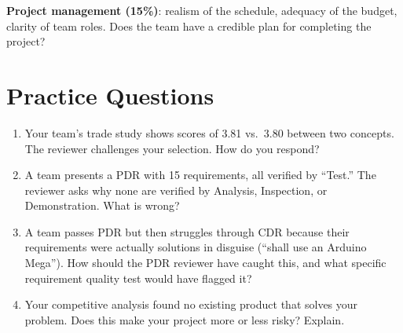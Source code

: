 \textbf{Project management (15\%)}: realism of the schedule, adequacy of the budget, clarity of team roles. Does the team have a credible plan for completing the project?
\section{Practice Questions}
\begin{enumerate}[leftmargin=1.5em]
\item Your team's trade study shows scores of 3.81 vs.\ 3.80 between two concepts. The reviewer challenges your selection. How do you respond?
\item A team presents a PDR with 15 requirements, all verified by ``Test.'' The reviewer asks why none are verified by Analysis, Inspection, or Demonstration. What is wrong?

\item A team passes PDR but then struggles through CDR because their requirements were actually solutions in disguise (``shall use an Arduino Mega''). How should the PDR reviewer have caught this, and what specific requirement quality test would have flagged it?
\item Your competitive analysis found no existing product that solves your problem. Does this make your project more or less risky? Explain.
\end{enumerate}

